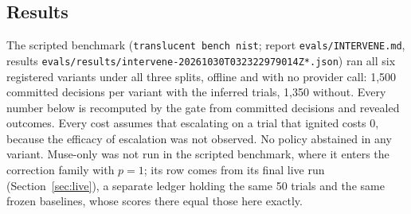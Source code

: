 \documentclass[11pt]{article}
\newcommand{\cmd}[1]{\texttt{#1}}
\begin{document}
\subsection{Results}\label{sec:results}
The scripted benchmark (\cmd{translucent bench nist}; report \cmd{evals/INTERVENE.md}, results
\cmd{evals/results/intervene-20261030T032322979014Z*.json}) ran all six registered variants under all three splits,
offline and with no provider call: 1{,}500 committed decisions per variant with the inferred trials, 1{,}350 without.
Every number below is recomputed by the gate from committed decisions and revealed outcomes. Every cost assumes that
escalating on a trial that ignited costs 0, because the efficacy of escalation was not observed. No policy abstained
in any variant. Muse-only was not run in the scripted benchmark, where it enters the correction family with
$p = 1$; its row comes from its final live run (Section~\ref{sec:live}), a separate ledger holding the same 50 trials
and the same frozen baselines, whose scores there equal those here exactly.
\end{document}
